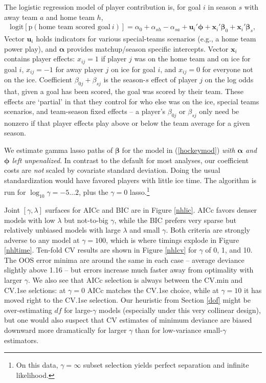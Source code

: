 \documentclass[12pt]{article}
\newcommand{\bs}[1]{\boldsymbol{#1}}
\newcommand{\mr}[1]{\mathrm{#1}}
\newcommand{\bm}[1]{\mathbf{#1}}
\begin{document}
The logistic regression model of player contribution is, for goal $i$ in
season $s$ with away team $a$ and home team $h$,
\begin{align}\label{hockeymod}
\mr{logit}\left[\mr{p}(\text{home~team~scored~goal}~i)\right] = \alpha_0 +
\alpha_{sh} - \alpha_{sa} + \bm{u}_i'\bs{\phi} + \bm{x}_i'\bs{\beta}_0 +
\bm{x}_i'\bs{\beta}_s, \end{align}  Vector $\bm{u}_i$ holds indicators for
various special-teams scenarios (e.g., a home team power play), and
$\bs{\alpha}$ provides matchup/season specific intercepts. Vector $\bm{x}_i$
contains player effects: $x_{ij}=1$ if player $j$ was on the home team and on
ice for goal $i$, $x_{ij}=-1$ for away player $j$ on ice for goal $i$, and
$x_{ij}=0$ for everyone not on the ice.   Coefficient $\beta_{0j} +
\beta_{sj}$ is the season-$s$ effect of player $j$ on the log odds that, given
a goal has been scored, the goal was scored by their team.  These effects are
`partial' in that they control for who else was on the ice, special teams
scenarios, and team-season fixed effects -- a player's $\beta_{0j}$ or $\beta_{sj}$
only need be nonzero if that player effects play above or below the team
average for a given season.

We estimate gamma lasso paths of $\bs{\beta}$ for the model in
(\ref{hockeymod}) {\it with  $\bs{\alpha}$ and $\bs{\phi}$ left unpenalized}.
In contrast to the default for most analyses, our coefficient costs are {\it
not} scaled by covariate standard deviation.  Doing the usual standardization
would have favored players with little ice time.  The algorithm is run for
$\log_{10}\gamma = -5 \ldots 2$, plus the $\gamma=0$ lasso.\footnote{On this
data, $\gamma=\infty$ subset selection yields perfect separation and infinite
likelihood.}

Joint $[\gamma,\lambda]$ surfaces for AICc and BIC are in Figure \ref{nhlic}.
AICc favors denser models with low $\lambda$ but not-to-big $\gamma$,
while the BIC  prefers very sparse but relatively unbiased  models with large
$\lambda$ and small $\gamma$.  Both criteria are strongly adverse to any model
at $\gamma=100$, which is where timings explode in Figure
\ref{nhltime}.  Ten-fold CV results are shown in Figure
\ref{nhlcv} for $\gamma$ of 0, 1, and 10.  The OOS error minima are around the
same in each case -- average deviance slightly above 1.16 -- but errors
increase much faster away from optimality with larger $\gamma$.   We also see
that AICc selection is always between the CV.min and CV.1se selctions:  at
$\gamma=0$ AICc matches the CV.1se choice, while at $\gamma=10$ it has moved
right to the CV.1se  selection.  Our heuristic from Section \ref{dof} might be
over-estimating $df$ for large-$\gamma$ models (especially under this very
collinear design), but one would also suspect that CV estimates of minimum
deviance are biased downward more dramatically for larger $\gamma$ than for
low-variance small-$\gamma$ estimators.
\end{document}
